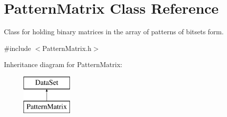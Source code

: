 \hypertarget{classPatternMatrix}{}\section{Pattern\+Matrix Class Reference}
\label{classPatternMatrix}


Class for holding binary matrices in the array of patterns of bitsets form.  




{\ttfamily \#include $<$Pattern\+Matrix.\+h$>$}

Inheritance diagram for Pattern\+Matrix\+:\begin{figure}[H]
\begin{center}
\leavevmode
\includegraphics[height=2.000000cm]{classPatternMatrix}
\end{center}
\end{figure}
